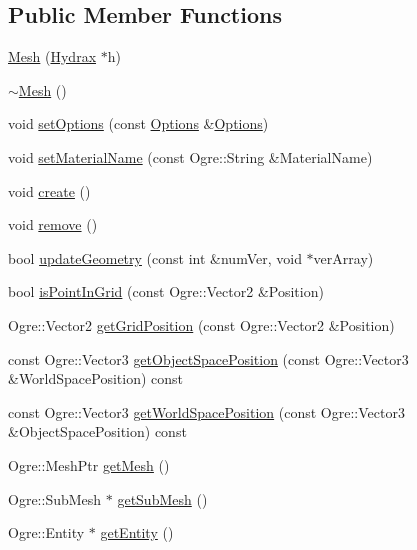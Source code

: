 \begin{CompactItemize}
\subsection*{Public Member Functions}
\begin{CompactItemize}
\item 
\hyperlink{class_hydrax_1_1_mesh_41f0a13afda56a307d18e53ff66425f7}{Mesh} (\hyperlink{class_hydrax_1_1_hydrax}{Hydrax} $\ast$h)
\item 
\hyperlink{class_hydrax_1_1_mesh_3f2ca0de1fa86ed289bf062ceaadb553}{$\sim$Mesh} ()
\item 
void \hyperlink{class_hydrax_1_1_mesh_69d55fde534e5a28044ef088b11774fb}{setOptions} (const \hyperlink{struct_hydrax_1_1_mesh_1_1_options}{Options} \&\hyperlink{struct_hydrax_1_1_mesh_1_1_options}{Options})
\item 
void \hyperlink{class_hydrax_1_1_mesh_43b930f0d0e03f95799de998780727cc}{setMaterialName} (const Ogre::String \&MaterialName)
\item 
void \hyperlink{class_hydrax_1_1_mesh_202f11f0f3c109cb93c516fe83f1dc0d}{create} ()
\item 
void \hyperlink{class_hydrax_1_1_mesh_5091867b361900642f5892e56661c790}{remove} ()
\item 
bool \hyperlink{class_hydrax_1_1_mesh_7eecc57d699ca2c4eadbcfd9db584f7a}{updateGeometry} (const int \&numVer, void $\ast$verArray)
\item 
bool \hyperlink{class_hydrax_1_1_mesh_fc8ea18b26652bac0710ef6fcb4c5969}{isPointInGrid} (const Ogre::Vector2 \&Position)
\item 
Ogre::Vector2 \hyperlink{class_hydrax_1_1_mesh_12f5fa6397bc9cb5501d0e246b8a952c}{getGridPosition} (const Ogre::Vector2 \&Position)
\item 
const Ogre::Vector3 \hyperlink{class_hydrax_1_1_mesh_999d2b1a4ce0ccc1b23ebe80541e4a97}{getObjectSpacePosition} (const Ogre::Vector3 \&WorldSpacePosition) const 
\item 
const Ogre::Vector3 \hyperlink{class_hydrax_1_1_mesh_6b1be78ee3f7b3da03aee363025c76e7}{getWorldSpacePosition} (const Ogre::Vector3 \&ObjectSpacePosition) const 
\item 
Ogre::MeshPtr \hyperlink{class_hydrax_1_1_mesh_a2cd7950048f839a3997299173b22bfb}{getMesh} ()
\item 
Ogre::SubMesh $\ast$ \hyperlink{class_hydrax_1_1_mesh_2eca9f2fe7879fd541163a5b21b17323}{getSubMesh} ()
\item 
Ogre::Entity $\ast$ \hyperlink{class_hydrax_1_1_mesh_a50c84e94aea20428cd56835cd6d26c3}{getEntity} ()

\end{CompactItemize}
\end{CompactItemize}
